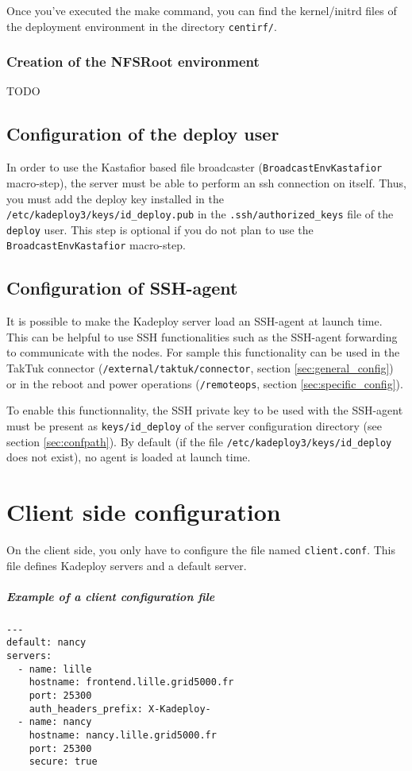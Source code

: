 \documentclass[a4wide,10pt,oneside]{book}
\newcommand{\ypath}[1]{\texttt{#1}}
\begin{document}
Once you've executed the make command, you can find the kernel/initrd files of the deployment environment in the directory \texttt{centirf/}.

\subsection{Creation of the NFSRoot environment}
TODO

\section{Configuration of the deploy user}
In order to use the Kastafior based file broadcaster (\texttt{BroadcastEnvKastafior} macro-step), the server must be able to perform an ssh connection on itself. Thus, you must add the deploy key installed in the \texttt{/etc/kadeploy3/keys/id\_deploy.pub} in the \texttt{.ssh/authorized\_keys} file of the \texttt{deploy} user. This step is optional if you do not plan to use the \texttt{BroadcastEnvKastafior} macro-step.

\section{Configuration of SSH-agent}
It is possible to make the Kadeploy server load an SSH-agent at launch time. This can be helpful to use SSH functionalities such as the SSH-agent forwarding to communicate with the nodes. For sample this functionality can be used in the TakTuk connector (\ypath{/external/taktuk/connector}, section \ref{sec:general_config}) or in the reboot and power operations (\ypath{/remoteops}, section \ref{sec:specific_config}).

To enable this functionnality, the SSH private key to be used with the SSH-agent must be present as \texttt{keys/id\_deploy} of the server configuration directory (see section \ref{sec:confpath}). By default (if the file \texttt{/etc/kadeploy3/keys/id\_deploy} does not exist), no agent is loaded at launch time.

\chapter{Client side configuration}\label{chap:Client_side_conf}
On the client side, you only have to configure the file named \texttt{client.conf}. This file defines Kadeploy servers and a default server.

\paragraph{Example of a client configuration file}
\begin{verbatim}
---
default: nancy
servers:
  - name: lille
    hostname: frontend.lille.grid5000.fr
    port: 25300
    auth_headers_prefix: X-Kadeploy-
  - name: nancy
    hostname: nancy.lille.grid5000.fr
    port: 25300
    secure: true
\end{verbatim}
\end{document}
